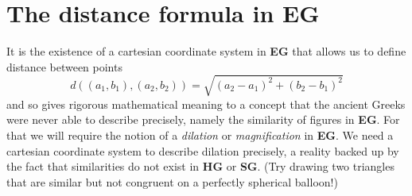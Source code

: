 \documentclass[newpage,hints,handout]{ximera}
\begin{document}
\section*{The distance formula in \textbf{EG}}

It is the existence of a cartesian coordinate system in \textbf{EG} that
allows us to define distance between points%
\[
d\left( (a_{1},b_{1}), (a_{2},b_{2}) \right)
=\sqrt{(a_{2}-a_{1})^{2}+(b_{2}-b_{1})^{2}}
\]
and so gives rigorous mathematical meaning to a concept that the
ancient Greeks were never able to describe precisely, namely the
similarity of figures in \textbf{EG}. For that we will require the
notion of a \textit{dilation} or \textit{magnification} in
\textbf{EG}. We need a cartesian coordinate system to describe
dilation precisely, a reality backed up by the fact that similarities
do not exist in \textbf{HG} or \textbf{SG}. (Try drawing two triangles
that are similar but not congruent on a perfectly spherical balloon!)
\end{document}
